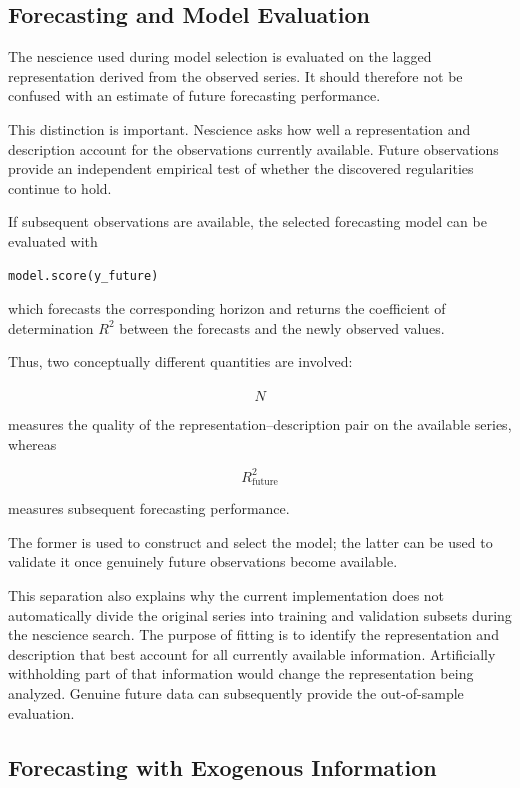 \subsection*{Forecasting and Model Evaluation}

The nescience used during model selection is evaluated on the lagged
representation derived from the observed series. It should therefore not be
confused with an estimate of future forecasting performance.

This distinction is important. Nescience asks how well a representation and
description account for the observations currently available. Future observations
provide an independent empirical test of whether the discovered regularities
continue to hold.

If subsequent observations are available, the selected forecasting model can be
evaluated with

\begin{sourcecode}
{\scriptsize
\begin{verbatim}
model.score(y_future)
\end{verbatim}}
\end{sourcecode}

which forecasts the corresponding horizon and returns the coefficient of
determination \(R^2\) between the forecasts and the newly observed values.

Thus, two conceptually different quantities are involved:

\[
\widehat N
\]

measures the quality of the representation--description pair on the available
series, whereas

\[
R^2_{\mathrm{future}}
\]

measures subsequent forecasting performance.

The former is used to construct and select the model; the latter can be used to
validate it once genuinely future observations become available.

This separation also explains why the current implementation does not
automatically divide the original series into training and validation subsets
during the nescience search. The purpose of fitting is to identify the
representation and description that best account for all currently available
information. Artificially withholding part of that information would change the
representation being analyzed. Genuine future data can subsequently provide the
out-of-sample evaluation.

\subsection*{Forecasting with Exogenous Information}

